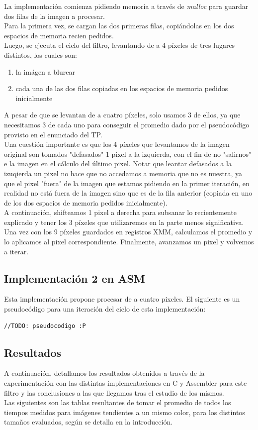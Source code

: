 La implementación comienza pidiendo memoria a través de \textit{malloc} para guardar dos filas de la imagen a procesar.\\Para la primera vez, se cargan las dos primeras filas, copiándolas en los dos espacios de memoria recien pedidos.\\
Luego, se ejecuta el ciclo del filtro, levantando de a 4 píxeles de tres lugares distintos, los cuales son:
\begin{enumerate}
\item la imágen a blurear
\item cada una de las dos filas copiadas en los espacios de memoria pedidos inicialmente
\end{enumerate}
A pesar de que se levantan de a cuatro píxeles, solo usamos 3 de ellos, ya que necesitamos 3 de cada uno para conseguir el promedio dado por el pseudocódigo provisto en el enunciado del TP.\\
Una cuestión importante es que los 4 píxeles que levantamos de la imagen original son tomados "defasados" 1 pixel a la izquierda, con el fin de no "salirnos" e la imagen en el cálculo del último pixel. Notar que leantar defasados a la izuqierda un pixel no hace que no accedamos a memoria que no es nuestra, ya que el pixel "fuera" de la imagen que estamos pidiendo en la primer iteración, en realidad no está fuera de la imagen sino que es de la fila anterior (copiada en uno de los dos espacios de memoria pedidos inicialmente).\\
A continuación, shifteamos 1 pixel a derecha para subsanar lo recientemente explicado y tener los 3 píxeles que utilizaremos en la parte menos significativa.\\
Una vez con los 9 píxeles guardados en registros XMM, calculamos el promedio y lo aplicamos al pixel correspondiente. 
Finalmente, avanzamos un pixel y volvemos a iterar.\\

\subsection{Implementación 2 en ASM}
Esta implementación propone procesar de a cuatro pixeles.
El siguiente es un pseudocódigo para una iteración del ciclo de esta implementación:

\begin{lstlisting}
//TODO: pseudocodigo :P
\end{lstlisting}


\subsection{Resultados}
A continuación, detallamos los resultados obtenidos a través de la experimentación con las distintas implementaciones en C y Assembler para este filtro y las conclusiones a las que llegamos tras el estudio de los mismos.\\
Las siguientes son las tablas resultantes de tomar el promedio de todos los tiempos medidos para imágenes tendientes a un mismo color, para los distintos tamaños evaluados, según se detalla en la introducción.\\

